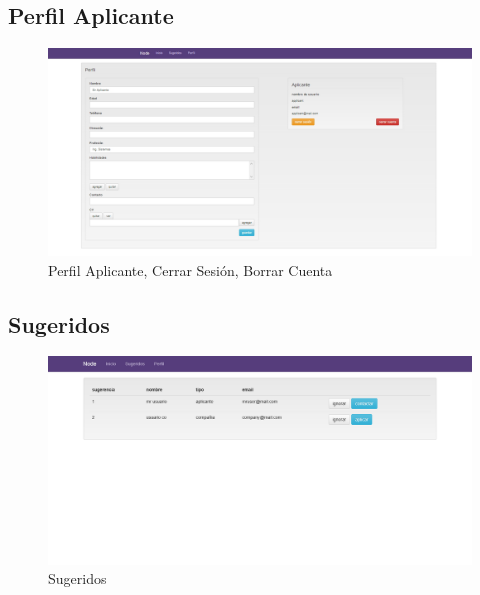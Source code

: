 \subsection{Perfil Aplicante}
\begin{figure}[h]
\begin{center}
	\includegraphics[scale=1.5]{./resources/vistas/perfilAplicante.jpg}
	\caption{Perfil Aplicante, Cerrar Sesión, Borrar Cuenta}
	\label{fig:perfilA}
\end{center}
\end{figure}


\newpage 
\subsection{Sugeridos}
\begin{figure}[h]
\begin{center}
	\includegraphics[scale=0.40]{./resources/vistas/sugeridos.png}
	\caption{Sugeridos}
	\label{fig:exito}
\end{center}
\end{figure}


\newpage 

